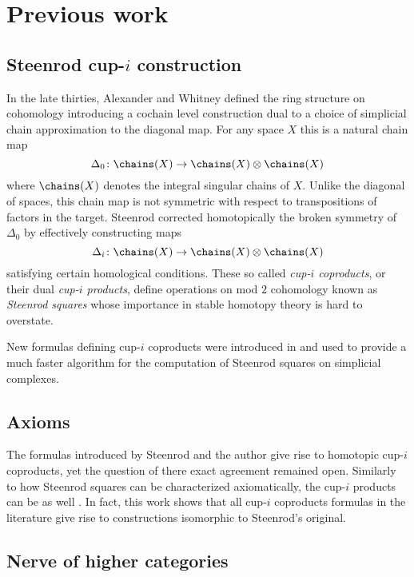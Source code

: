 \section{Previous work} \label{s:past}

\subsection{Steenrod cup-$i$ construction} \label{ss:cup-i}

In the late thirties, Alexander and Whitney defined the ring structure on cohomology introducing a cochain level construction dual to a choice of simplicial chain approximation to the diagonal map.
For any space $X$ this is a natural chain map
\[
\Delta_0 \colon \chains(X) \to \chains(X) \otimes \chains(X)
\]
where $\chains(X)$ denotes the integral singular chains of $X$.
Unlike the diagonal of spaces, this chain map is not symmetric with respect to transpositions of factors in the target.
Steenrod \cite{steenrod1947products} corrected homotopically the broken symmetry of $\Delta_0$ by effectively constructing maps
\begin{equation*}
\Delta_i \colon \chains(X) \to \chains(X) \otimes \chains(X)
\end{equation*}
satisfying certain homological conditions.
These so called \textit{cup-$i$ coproducts}, or their dual \textit{cup-$i$ products}, define operations on mod $2$ cohomology known as \textit{Steenrod squares} whose importance in stable homotopy theory is hard to overstate.

New formulas defining cup-$i$ coproducts were introduced in \cite{medina2023fast_sq} and used to provide a much faster algorithm for the computation of Steenrod squares on simplicial complexes.

\subsection{Axioms}

The formulas introduced by Steenrod and the author give rise to homotopic cup-$i$ coproducts, yet the question of there exact agreement remained open.
Similarly to how Steenrod squares can be characterized axiomatically, the cup-$i$ products can be as well \cite{medina2022axiomatic}.
In fact, this work shows that all cup-$i$ coproducts formulas in the literature give rise to constructions isomorphic to Steenrod's original.

\subsection{Nerve of higher categories} \label{ss:nerve}

